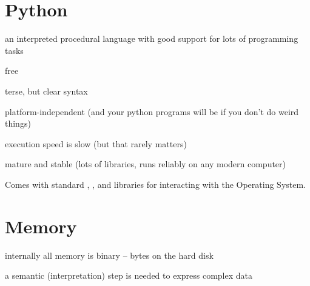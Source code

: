 \documentclass[landscape]{foils}
\begin{document}
\myNewSlide
\section*{Python}
\begin{compactenum}
	\item an interpreted procedural language with good support for lots of programming tasks
	\item free
	\item terse, but clear syntax
	\item platform-independent (and your python programs will be if you don't do weird things)
	\item execution speed is slow (but that rarely matters)
	\item mature and stable (lots of libraries, runs reliably on any modern computer)
	\item Comes with standard , , and  libraries for interacting with the Operating System.
\end{compactenum}

\myNewSlide
\section*{Memory}
\large
\begin{compactenum}
	\item internally all memory is binary -- bytes on the hard disk
	\item a semantic (interpretation) step is needed to express complex data
\end{compactenum}
\end{document}
